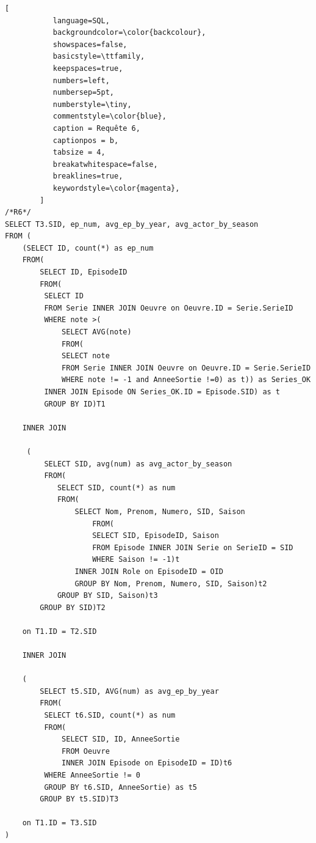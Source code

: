 \documentclass[10pt,a4paper]{article}
\begin{document}
\begin{lstlisting}[
           language=SQL,
           backgroundcolor=\color{backcolour},
           showspaces=false,
           basicstyle=\ttfamily,
           keepspaces=true,                 
           numbers=left,                    
           numbersep=5pt,
           numberstyle=\tiny,
           commentstyle=\color{blue},
           caption = Requête 6,
           captionpos = b,
           tabsize = 4,
           breakatwhitespace=false,         
    	   breaklines=true,
           keywordstyle=\color{magenta},
        ]
/*R6*/
SELECT T3.SID, ep_num, avg_ep_by_year, avg_actor_by_season
FROM (
	(SELECT ID, count(*) as ep_num
	FROM(
		SELECT ID, EpisodeID
		FROM(
		 SELECT ID
		 FROM Serie INNER JOIN Oeuvre on Oeuvre.ID = Serie.SerieID
		 WHERE note >(
			 SELECT AVG(note)
			 FROM(
			 SELECT note
			 FROM Serie INNER JOIN Oeuvre on Oeuvre.ID = Serie.SerieID
			 WHERE note != -1 and AnneeSortie !=0) as t)) as Series_OK
		 INNER JOIN Episode ON Series_OK.ID = Episode.SID) as t
		 GROUP BY ID)T1

	INNER JOIN

	 (
		 SELECT SID, avg(num) as avg_actor_by_season
		 FROM(
			SELECT SID, count(*) as num
			FROM(
				SELECT Nom, Prenom, Numero, SID, Saison
					FROM(
					SELECT SID, EpisodeID, Saison
					FROM Episode INNER JOIN Serie on SerieID = SID
					WHERE Saison != -1)t
				INNER JOIN Role on EpisodeID = OID
				GROUP BY Nom, Prenom, Numero, SID, Saison)t2
			GROUP BY SID, Saison)t3
		GROUP BY SID)T2

	on T1.ID = T2.SID

	INNER JOIN

	(
		SELECT t5.SID, AVG(num) as avg_ep_by_year
		FROM(
		 SELECT t6.SID, count(*) as num
		 FROM(
			 SELECT SID, ID, AnneeSortie
			 FROM Oeuvre
			 INNER JOIN Episode on EpisodeID = ID)t6
		 WHERE AnneeSortie != 0
		 GROUP BY t6.SID, AnneeSortie) as t5
		GROUP BY t5.SID)T3

	on T1.ID = T3.SID
)
   
\end{lstlisting}
\end{document}
